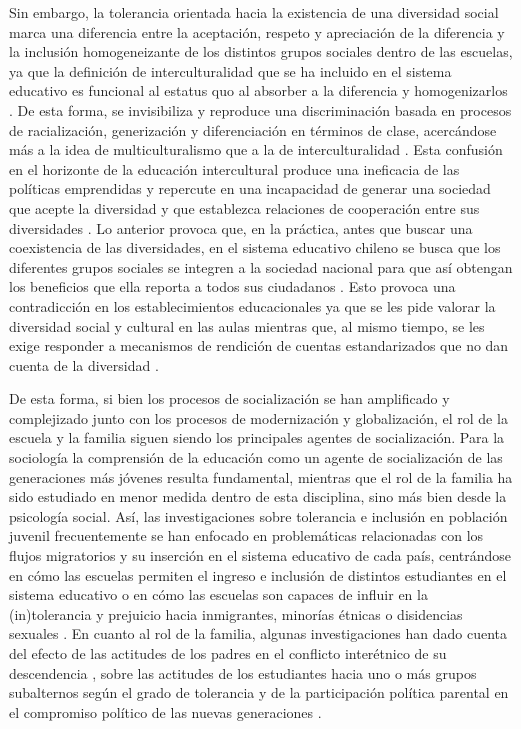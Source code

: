 \documentclass[12pt,twoside]{templates/facsothesis}
\begin{document}
Sin embargo, la tolerancia orientada hacia la existencia de una diversidad social marca una diferencia entre la aceptación, respeto y apreciación de la diferencia y la inclusión homogeneizante de los distintos grupos sociales dentro de las escuelas, ya que la definición de interculturalidad que se ha incluido en el sistema educativo es funcional al estatus quo al absorber a la diferencia y homogenizarlos \citep{riedemann_Desde_2020}. De esta forma, se invisibiliza y reproduce una discriminación basada en procesos de racialización, generización y diferenciación en términos de clase, acercándose más a la idea de multiculturalismo que a la de interculturalidad \citep{stefoni_Educacion_2016a}. Esta confusión en el horizonte de la educación intercultural produce una ineficacia de las políticas emprendidas y repercute en una incapacidad de generar una sociedad que acepte la diversidad y que establezca relaciones de cooperación entre sus diversidades \citep{donosoromo_INTERCULTURALIDAD_2006}. Lo anterior provoca que, en la práctica, antes que buscar una coexistencia de las diversidades, en el sistema educativo chileno se busca que los diferentes grupos sociales se integren a la sociedad nacional para que así obtengan los beneficios que ella reporta a todos sus ciudadanos \citep{donosoromo_INTERCULTURALIDAD_2006}. Esto provoca una contradicción en los establecimientos educacionales ya que se les pide valorar la diversidad social y cultural en las aulas mientras que, al mismo tiempo, se les exige responder a mecanismos de rendición de cuentas estandarizados que no dan cuenta de la diversidad \citep{riedemann_Desde_2020}.

De esta forma, si bien los procesos de socialización se han amplificado y complejizado junto con los procesos de modernización y globalización, el rol de la escuela y la familia siguen siendo los principales agentes de socialización. Para la sociología la comprensión de la educación como un agente de socialización de las generaciones más jóvenes resulta fundamental, mientras que el rol de la familia ha sido estudiado en menor medida dentro de esta disciplina, sino más bien desde la psicología social. Así, las investigaciones sobre tolerancia e inclusión en población juvenil frecuentemente se han enfocado en problemáticas relacionadas con los flujos migratorios y su inserción en el sistema educativo de cada país, centrándose en cómo las escuelas permiten el ingreso e inclusión de distintos estudiantes en el sistema educativo \citep{bellei_estudio_2013, ortiz_Actitudes_2016, stefoni_Educacion_2016a} o en cómo las escuelas son capaces de influir en la (in)tolerancia y prejuicio hacia inmigrantes, minorías étnicas o disidencias sexuales \citep{lee_Tolerated_2014, maurissen_Classroom_2020, trevino_Influence_2018}. En cuanto al rol de la familia, algunas investigaciones han dado cuenta del efecto de las actitudes de los padres en el conflicto interétnico de su descendencia \citep{medjedovic_intergroup_2021}, sobre las actitudes de los estudiantes hacia uno o más grupos subalternos según el grado de tolerancia \citep{farkac_Tolerance_2020} y de la participación política parental en el compromiso político de las nuevas generaciones \citep{bacovsky_raising_2021}.
\end{document}
